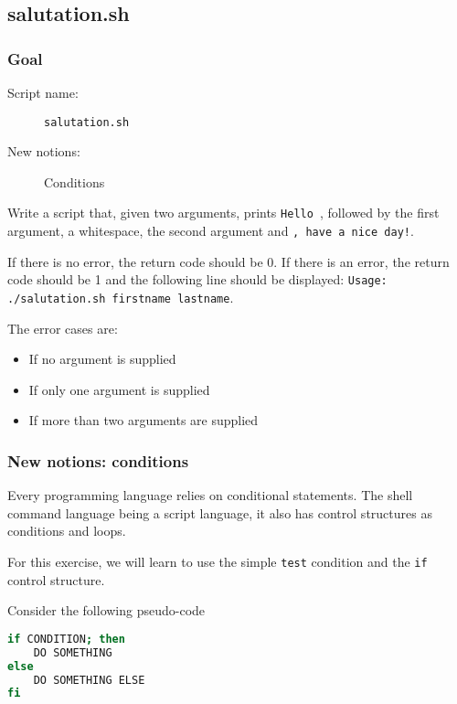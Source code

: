 \documentclass[12pt]{article}
\begin{document}
\subsection{salutation.sh}

\subsubsection{Goal}

\begin{description}
    \item[Script name:] \texttt{salutation.sh}
    \item[New notions:] Conditions
\end{description}

Write a script that, given two arguments, prints \texttt{Hello }, followed by the first argument, a whitespace, the second argument and \texttt{, have a nice day!}. 

If there is no error, the return code should be 0. If there is an error, the return code should be 1 and the following line should be displayed: \texttt{Usage: ./salutation.sh firstname lastname}.

The error cases are: 

\begin{itemize}
        \item If no argument is supplied
        \item If only one argument is supplied
        \item If more than two arguments are supplied
\end{itemize}

\subsubsection{New notions: conditions}

Every programming language relies on conditional statements. The shell command language being a script language, it also has control structures as conditions and loops.

For this exercise, we will learn to use the simple \texttt{test} condition and the \texttt{if} control structure.

Consider the following pseudo-code

\begin{lstlisting}[language=bash]
if CONDITION; then
	DO SOMETHING
else
	DO SOMETHING ELSE
fi
\end{lstlisting}
\end{document}

